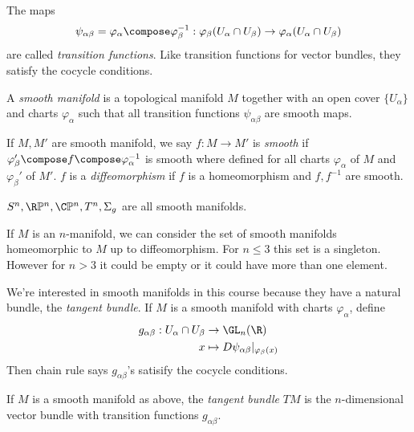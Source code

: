 \documentclass[a4paper]{article}
\renewcommand*{\P}{\mathbb{P}}
\begin{document}
The maps
\[
  \psi_{\alpha\beta} = \varphi_\alpha \compose \varphi_\beta^{-1}: \varphi_\beta(U_\alpha \cap U_\beta) \to \varphi_\alpha(U_\alpha \cap U_\beta)
\]
are called \emph{transition functions}. Like transition functions for vector bundles, they satisfy the cocycle conditions.

\begin{definition}
  A \emph{smooth manifold} is a topological manifold \(M\) together with an open cover \(\{U_\alpha\}\) and charts \(\varphi_\alpha\) such that all transition functions \(\psi_{\alpha\beta}\) are smooth maps.

  If \(M, M'\) are smooth manifold, we say \(f: M \to M'\) is \emph{smooth} if \(\varphi_\beta' \compose f \compose \varphi_\alpha^{-1}\) is smooth where defined for all charts \(\varphi_\alpha\) of \(M\) and \(\varphi_\beta'\) of \(M'\). \(f\) is a \emph{diffeomorphism} if \(f\) is a homeomorphism and \(f, f^{-1}\) are smooth.
\end{definition}

\begin{eg}
  \(S^n, \R\P^n, \C\P^n, T^n, \Sigma_g\) are all smooth manifolds.
\end{eg}

\begin{remark}
  If \(M\) is an \(n\)-manifold, we can consider the set of smooth manifolds homeomorphic to \(M\) up to diffeomorphism. For \(n \leq 3\) this set is a singleton. However for \(n > 3\) it could be empty or it could have more than one element.
\end{remark}

We're interested in smooth manifolds in this course because they have a natural bundle, the \emph{tangent bundle}. If \(M\) is a smooth manifold with charts \(\varphi_\alpha\), define
\begin{align*}
  g_{\alpha\beta}: U_\alpha \cap U_\beta &\to \GL_n(\R) \\
  x &\mapsto D \psi_{\alpha\beta}|_{\varphi_\beta(x)}
\end{align*}
Then chain rule says \(g_{\alpha\beta}\)'s satisify the cocycle conditions.

\begin{definition}
  If \(M\) is a smooth manifold as above, the \emph{tangent bundle} \(TM\) is the \(n\)-dimensional vector bundle with transition functions \(g_{\alpha\beta}\).
\end{definition}
\end{document}
